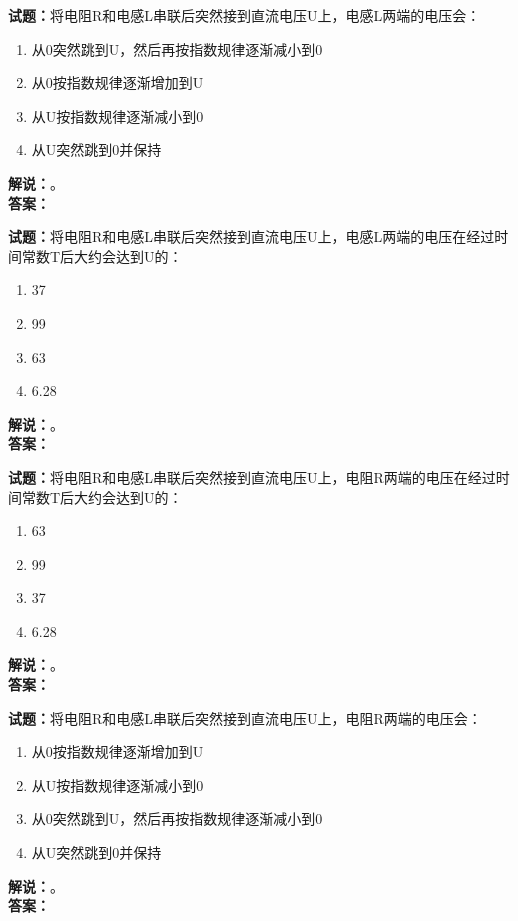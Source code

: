 \documentclass{ctexbook}
\begin{document}
\bigskip




\noindent\textbf{试题：}将电阻R和电感L串联后突然接到直流电压U上，电感L两端的电压会：
\begin{enumerate}[leftmargin=3em]
\item 从0突然跳到U，然后再按指数规律逐渐减小到0
\item 从0按指数规律逐渐增加到U
\item 从U按指数规律逐渐减小到0
\item 从U突然跳到0并保持
\end{enumerate}
\noindent\textbf{解说：}\textbf{}。\\\noindent\textbf{答案：}

\bigskip




\noindent\textbf{试题：}将电阻R和电感L串联后突然接到直流电压U上，电感L两端的电压在经过时间常数T后大约会达到U的：
\begin{enumerate}[leftmargin=3em]
\item 37%
\item 99%
\item 63%
\item 6.28%
\end{enumerate}
\noindent\textbf{解说：}\textbf{}。\\\noindent\textbf{答案：}

\bigskip




\noindent\textbf{试题：}将电阻R和电感L串联后突然接到直流电压U上，电阻R两端的电压在经过时间常数T后大约会达到U的：
\begin{enumerate}[leftmargin=3em]
\item 63%
\item 99%
\item 37%
\item 6.28%
\end{enumerate}
\noindent\textbf{解说：}\textbf{}。\\\noindent\textbf{答案：}

\bigskip




\noindent\textbf{试题：}将电阻R和电感L串联后突然接到直流电压U上，电阻R两端的电压会：
\begin{enumerate}[leftmargin=3em]
\item 从0按指数规律逐渐增加到U
\item 从U按指数规律逐渐减小到0
\item 从0突然跳到U，然后再按指数规律逐渐减小到0
\item 从U突然跳到0并保持
\end{enumerate}
\noindent\textbf{解说：}\textbf{}。\\\noindent\textbf{答案：}
\end{document}
